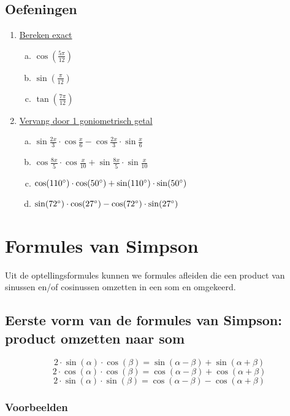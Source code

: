 \documentclass[a4paper,12pt]{article}
\begin{document}
\subsection{Oefeningen}
\begin{enumerate}[(1)]
  \item \underline{Bereken exact}
    \begin{enumerate}[(a)]
      \item $\cos(\frac{5\pi}{12})$
      \item $\sin(\frac{\pi}{12})$
      \item $\tan(\frac{7\pi}{12})$
    \end{enumerate}
  \item \underline{Vervang door 1 goniometrisch getal}
    \begin{enumerate}[(a)]
      \item $\sin\frac{2x}{3}\cdot \cos\frac{x}{6}-\cos\frac{2x}{3}\cdot \sin\frac{x}{6}$
      \item $\cos\frac{8x}{5}\cdot \cos\frac{x}{10}+\sin\frac{8x}{5}\cdot \sin\frac{x}{10}$
      \item $\cos(110^\circ)\cdot \cos(50^\circ)+\sin(110^\circ)\cdot \sin(50^\circ)$
      \item $\sin(72^\circ)\cdot \cos(27^\circ)-\cos(72^\circ)\cdot \sin(27^\circ)$
    \end{enumerate}
\end{enumerate}

\newpage
\section{Formules van Simpson}
Uit de optellingsformules kunnen we formules afleiden die een product van sinussen en/of cosinussen omzetten in een som en omgekeerd.
\subsection{Eerste vorm van de formules van Simpson: product omzetten naar som}
\[2\cdot \sin(\alpha)\cdot \cos(\beta)=\sin(\alpha-\beta)+\sin(\alpha+\beta)
\]
\[2\cdot \cos(\alpha)\cdot \cos(\beta)=\cos(\alpha-\beta)+\cos(\alpha+\beta)
\]
\[2\cdot \sin(\alpha)\cdot \sin(\beta)=\cos(\alpha-\beta)-\cos(\alpha+\beta)
\]

\subsubsection{Voorbeelden}
\end{document}
